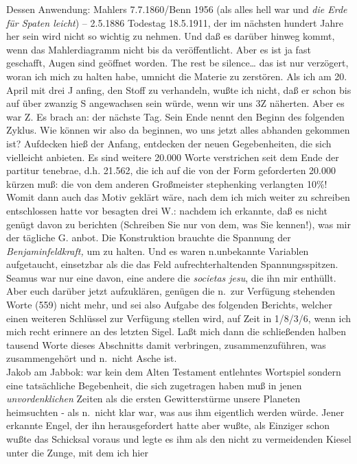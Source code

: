 \documentclass[
]{article}
\begin{document}
Dessen Anwendung: Mahlers 7.7.1860/Benn 1956 (als alles hell war und
\emph{die Erde für Spaten leicht}) -- 2.5.1886 Todestag 18.5.1911, der
im nächsten hundert Jahre her sein wird nicht so wichtig zu nehmen. Und
daß es darüber hinweg kommt, wenn das Mahlerdiagramm nicht bis da
veröffentlicht. Aber es ist ja fast geschafft, Augen sind geöffnet
worden. The rest be silence\ldots{} das ist nur verzögert, woran ich
mich zu halten habe, umnicht die Materie zu zerstören. Als ich am 20.
April mit drei J anfing, den Stoff zu verhandeln, wußte ich nicht, daß
er schon bis auf über zwanzig S angewachsen sein würde, wenn wir uns 3Z
näherten. Aber es war Z. Es brach an: der nächste Tag. Sein Ende nennt
den Beginn des folgenden Zyklus. Wie können wir also da beginnen, wo uns
jetzt alles abhanden gekommen ist? Aufdecken hieß der Anfang, entdecken
der neuen Gegebenheiten, die sich vielleicht anbieten. Es sind weitere
20.000 Worte verstrichen seit dem Ende der partitur tenebrae, d.h.
21.562, die ich auf die von der Form geforderten 20.000 kürzen muß: die
von dem anderen Großmeister stephenking verlangten 10\%! Womit dann auch
das Motiv geklärt wäre, nach dem ich mich weiter zu schreiben
entschlossen hatte vor besagten drei W.: nachdem ich erkannte, daß es
nicht genügt davon zu berichten (Schreiben Sie nur von dem, was Sie
kennen!), was mir der tägliche G. anbot. Die Konstruktion brauchte die
Spannung der \emph{Benjaminfeldkraft,} um zu halten. Und es waren
n.unbekannte Variablen aufgetaucht, einsetzbar als die das Feld
aufrechterhaltenden Spannungsspitzen. Seamus war nur eine davon, eine
andere die \emph{societas jesu}, die ihn mir enthüllt. Aber euch darüber
jetzt aufzuklären, genügen die n.~zur Verfügung stehenden Worte (559)
nicht mehr, und sei also Aufgabe des folgenden Berichts, welcher einen
weiteren Schlüssel zur Verfügung stellen wird, auf Zeit in 1/8/3/6, wenn
ich mich recht erinnere an des letzten Sigel. Laßt mich dann die
schließenden halben tausend Worte dieses Abschnitts damit verbringen,
zusammenzuführen, was zusammengehört und n.~nicht Asche ist.\\
Jakob am Jabbok: war kein dem Alten Testament entlehntes Wortspiel
sondern eine tatsächliche Begebenheit, die sich zugetragen haben muß in
jenen \emph{unvordenklichen} Zeiten als die ersten Gewitterstürme unsere
Planeten heimsuchten - als n.~nicht klar war, was aus ihm eigentlich
werden würde. Jener erkannte Engel, der ihn herausgefordert hatte aber
wußte, als Einziger schon wußte das Schicksal voraus und legte es ihm
als den nicht zu vermeidenden Kiesel unter die Zunge, mit dem ich hier
\end{document}
